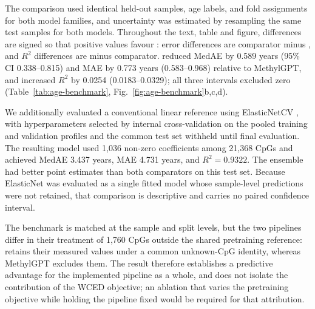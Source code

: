 The comparison used identical held-out samples, age labels, and fold assignments for both model
families, and uncertainty was estimated by resampling the same test samples for both models.
Throughout the text, table and figure, differences are signed so that positive values favour
\method{}: error differences are comparator minus \method{}, and $R^2$ differences are
\method{} minus comparator. \method{} reduced MedAE by 0.589 years (95\% CI 0.338--0.815) and
MAE by 0.773 years (0.583--0.968) relative to MethylGPT, and increased $R^2$ by 0.0254
(0.0183--0.0329); all three intervals excluded zero
(Table~\ref{tab:age-benchmark}, Fig.~\ref{fig:age-benchmark}b,c,d).

We additionally evaluated a conventional linear reference using ElasticNetCV \citep{Zou2005},
with hyperparameters selected by internal cross-validation on the pooled training and validation
profiles and the common test set withheld until final evaluation. The resulting model used
1,036 non-zero coefficients among 21,368 CpGs and achieved MedAE 3.437 years, MAE 4.731 years,
and $R^2=0.9322$. The \method{} ensemble had better point estimates than both comparators on
this test set. Because ElasticNet was evaluated as a single fitted model whose sample-level
predictions were not retained, that comparison is descriptive and carries no paired confidence
interval.

The benchmark is matched at the sample and split levels, but the two pipelines differ in their
treatment of 1,760 CpGs outside the shared pretraining reference: \method{} retains their
measured values under a common unknown-CpG identity, whereas MethylGPT excludes them. The
result therefore establishes a predictive advantage for the implemented \method{} pipeline as a
whole, and does not isolate the contribution of the WCED objective; an ablation that varies the
pretraining objective while holding the pipeline fixed would be required for that attribution.

